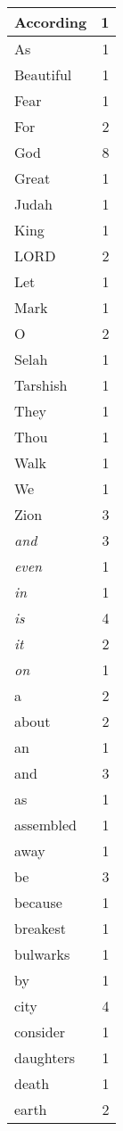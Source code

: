 \begin{center}
\begin{longtable}{l|r}
\hline \hline
\endlastfoot
According & 1 \\ \hline
As & 1 \\ \hline
Beautiful & 1 \\ \hline
Fear & 1 \\ \hline
For & 2 \\ \hline
God & 8 \\ \hline
Great & 1 \\ \hline
Judah & 1 \\ \hline
King & 1 \\ \hline
LORD & 2 \\ \hline
Let & 1 \\ \hline
Mark & 1 \\ \hline
O & 2 \\ \hline
Selah & 1 \\ \hline
Tarshish & 1 \\ \hline
They & 1 \\ \hline
Thou & 1 \\ \hline
Walk & 1 \\ \hline
We & 1 \\ \hline
Zion & 3 \\ \hline
\emph{and} & 3 \\ \hline
\emph{even} & 1 \\ \hline
\emph{in} & 1 \\ \hline
\emph{is} & 4 \\ \hline
\emph{it} & 2 \\ \hline
\emph{on} & 1 \\ \hline
a & 2 \\ \hline
about & 2 \\ \hline
an & 1 \\ \hline
and & 3 \\ \hline
as & 1 \\ \hline
assembled & 1 \\ \hline
away & 1 \\ \hline
be & 3 \\ \hline
because & 1 \\ \hline
breakest & 1 \\ \hline
bulwarks & 1 \\ \hline
by & 1 \\ \hline
city & 4 \\ \hline
consider & 1 \\ \hline
daughters & 1 \\ \hline
death & 1 \\ \hline
earth & 2 \\ \hline

\end{longtable}
\end{center}

